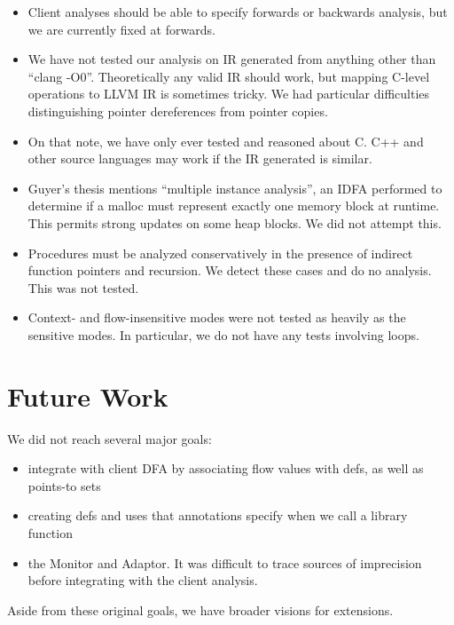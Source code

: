 \begin{itemize}
\item Client analyses should be able to specify forwards or backwards analysis,
      but we are currently fixed at forwards.
\item We have not tested our analysis on IR generated from anything other than
      ``clang -O0''. Theoretically any valid IR should work, but mapping C-level
      operations to LLVM IR is sometimes tricky. We had particular difficulties
      distinguishing pointer dereferences from pointer copies.
\item On that note, we have only ever tested and reasoned about C. C++ and other
      source languages may work if the IR generated is similar.
\item Guyer's thesis mentions ``multiple instance analysis'', an IDFA performed
      to determine if a malloc must represent exactly one memory block at runtime.
      This permits strong updates on some heap blocks. We did not attempt this.
\item Procedures must be analyzed conservatively in the presence of indirect
      function pointers and recursion. We detect these cases and do no analysis. This
      was not tested.
\item Context- and flow-insensitive modes were not tested as heavily as the
      sensitive modes. In particular, we do not have any tests involving loops.
\end{itemize}


\section{Future Work}

We did not reach several major goals:

\begin{itemize}
\item integrate with client DFA by associating flow values with defs, as well as
      points-to sets
\item creating defs and uses that annotations specify when we call a library
      function
\item the Monitor and Adaptor. It was difficult to trace sources of imprecision
      before integrating with the client analysis.
\end{itemize}

Aside from these original goals, we have broader visions for extensions.


